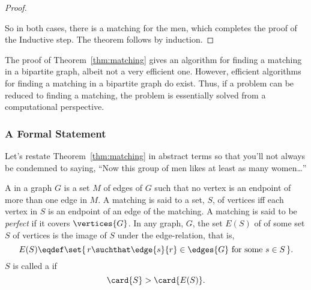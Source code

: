\begin{proof}
\begin{description}
\iffalse
We can also match the rest of the men by induction if we show that
  the matching condition holds for the remaining men and women.  To
  check the matching condition for the remaining people, consider an
  arbitrary subset of the remaining men $X' \subseteq (M - X)$, and
  let $Y'$ be the set of remaining women that they like.  We must show
  that $\card{X'} \leq \card{Y'}$.  Originally, the combined set of
  men $X \cup X'$ liked the set of women $Y \cup Y'$.  So, by the
  matching condition, we know:
%
  \begin{equation*}
  \card{X \cup X'}  \leq  \card{Y \cup Y'}
  \end{equation*}
%
  We sent away $\card{X}$ men from the set on the left (leaving $X'$)
  and sent away an equal number of women from the set on the right
  (leaving $Y'$).  Therefore, it must be that $\card{X'} \leq
  \card{Y'}$ as claimed.
\fi

\end{description}

So in both cases, there is a matching for the men, which completes the
proof of the Inductive step.  The theorem follows by induction.
\end{proof}

The proof of Theorem~\ref{thm:matching} gives an algorithm for finding
a matching in a bipartite graph, albeit not a very efficient one.
However, efficient algorithms for finding a matching in a bipartite
graph do exist.  Thus, if a problem can be reduced to finding a
matching, the problem is essentially solved from a computational
perspective.

\subsubsection{A Formal Statement}

Let's restate Theorem~\ref{thm:matching} in abstract terms so that
you'll not always be condemned to saying, ``Now this group of men
likes at least as many women\dots''

\begin{definition}\label{def:5K}
 A  in a graph $G$ is a set $M$
of edges of $G$ such that no vertex is an endpoint of more than one
edge in $M$.  A matching is said to  
 a set, $S$, of vertices iff each vertex in $S$ is
an endpoint of an edge of the matching.  A matching is said to be
\emph{perfect}  if it covers
$\vertices{G}$.  In any graph, $G$, the set $E(S)$ of  of
some set $S$ of vertices is the image of $S$ under the edge-relation,
\iffalse set of all vertices adjacent to some vertex in $S$.  \fi that
is,
\[
E(S) \eqdef \set{\,r \suchthat \edge{s}{r} \in \edges{G} \text{ for
    some } s \in S\,}.
\]
$S$ is called a  if
\[
\card{S} > \card{E(S)}.
\]
\end{definition}


